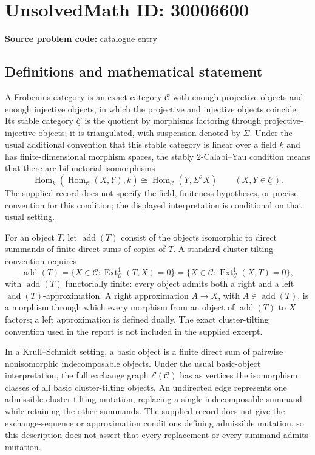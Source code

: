 \documentclass[11pt]{article}
\begin{document}
\section*{UnsolvedMath ID: 30006600}
\textbf{Source problem code:} catalogue entry
\subsection{Definitions and mathematical statement}
A Frobenius category is an exact category \(\mathcal C\) with enough projective objects and enough injective objects, in which the projective and injective objects coincide. Its stable category \(\underline{\mathcal C}\) is the quotient by morphisms factoring through projective-injective objects; it is triangulated, with suspension denoted by \(\Sigma\). Under the usual additional convention that this stable category is linear over a field \(k\) and has finite-dimensional morphism spaces, the stably \(2\)-Calabi--Yau condition means that there are bifunctorial isomorphisms
\[
\operatorname{Hom}_k\!\left(\operatorname{Hom}_{\underline{\mathcal C}}(X,Y),k\right)
\cong \operatorname{Hom}_{\underline{\mathcal C}}(Y,\Sigma^2X)
\qquad (X,Y\in\underline{\mathcal C}).
\]
The supplied record does not specify the field, finiteness hypotheses, or precise convention for this condition; the displayed interpretation is conditional on that usual setting.

For an object \(T\), let \(\operatorname{add}(T)\) consist of the objects isomorphic to direct summands of finite direct sums of copies of \(T\). A standard cluster-tilting convention requires
\[
\operatorname{add}(T)
=\{X\in\mathcal C:\operatorname{Ext}^1_{\mathcal C}(T,X)=0\}
=\{X\in\mathcal C:\operatorname{Ext}^1_{\mathcal C}(X,T)=0\},
\]
with \(\operatorname{add}(T)\) functorially finite: every object admits both a right and a left \(\operatorname{add}(T)\)-approximation. A right approximation \(A\to X\), with \(A\in\operatorname{add}(T)\), is a morphism through which every morphism from an object of \(\operatorname{add}(T)\) to \(X\) factors; a left approximation is defined dually. The exact cluster-tilting convention used in the report is not included in the supplied excerpt.

In a Krull--Schmidt setting, a basic object is a finite direct sum of pairwise nonisomorphic indecomposable objects. Under the usual basic-object interpretation, the full exchange graph \(\mathcal E(\mathcal C)\) has as vertices the isomorphism classes of all basic cluster-tilting objects. An undirected edge represents one admissible cluster-tilting mutation, replacing a single indecomposable summand while retaining the other summands. The supplied record does not give the exchange-sequence or approximation conditions defining admissible mutation, so this description does not assert that every replacement or every summand admits mutation.
\end{document}
